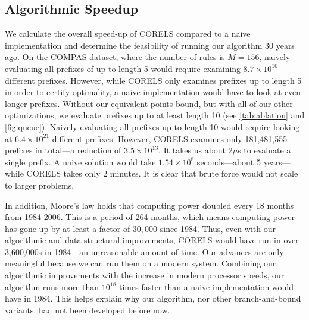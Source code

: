 \subsection{Algorithmic Speedup}
We calculate the overall speed-up of CORELS compared to a naive implementation and determine the feasibility of running
our algorithm 30 years ago.
%
On the COMPAS dataset, where the number of rules is $M = 156$, naively evaluating all prefixes of up to length 5 would
require examining $8.7 \times 10^{10}$ different prefixes.
%
However, while CORELS only examines prefixes up to length 5 in order to certify optimality, a naive implementation 
would have to look at even longer prefixes. 
%
Without our equivalent points bound, but with all of our other optimizations, we evaluate prefixes up to at least length 10 
(see \ref{tab:ablation} and \ref{fig:queue}).
%
Naively evaluating all prefixes up to length 10 would require looking at $6.4 \times 10^{21}$ different prefixes.
%
However, CORELS examines only 181,481,555 prefixes in total---a reduction of $3.5 \times 10^{13}$.
%
It takes us about 2$\mu$s to evaluate a single prefix.
%
A naive solution would take $1.54 \times 10^8$ seconds---about 5 years---while CORELS takes only 2 minutes.
%
It is clear that brute force would not scale to larger problems.
%


In addition, Moore's law holds that computing power doubled every 18 months from 1984-2006.
%
This is a period of 264 months, which means computing power has gone up by at least a factor of $30,000$ since 1984.
%
Thus, even with our algorithmic and data structural improvements, CORELS would have run in over 3,600,000s in 1984---an unreasonable amount of time.
%
Our advances are only meaningful because we can run them on a modern system.
%
Combining our algorithmic improvements with the increase in modern processor speeds, our algorithm runs more than $10^{18}$ times faster than a naive implementation would have in 1984.
%
This helps explain why our algorithm, nor other branch-and-bound variants, had not been developed before now.